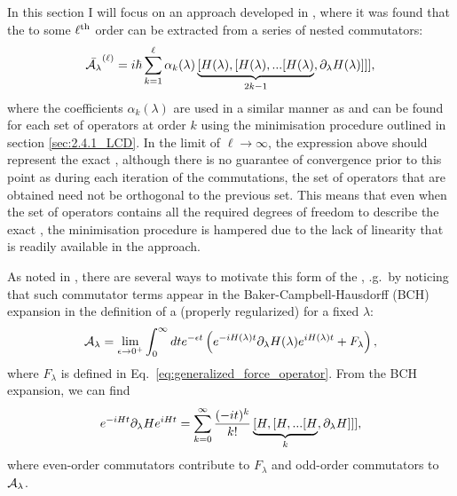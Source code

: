     In this section I will focus on an approach developed in \cite{claeys_floquet-engineering_2019}, where it was found that the  to some $\ell^{\rm th}$ order can be extracted from a series of nested commutators:
    \begin{equation}\label{eq:nested_commutator_AGP}
        \Bar{\mathcal{A}_{\lambda}}^{(\ell)} = i\hbar \sum_{k=1}^\ell \alpha_k(\lambda) \underbrace{[H(\lambda),[H(\lambda),...[H(\lambda)}_{2k-1},\partial_{\lambda} H(\lambda)]]],
    \end{equation}
    where the coefficients $\alpha_k(\lambda)$ are used in a similar manner as  and can be found for each set of operators at order $k$ using the minimisation procedure outlined in section \ref{sec:2.4.1_LCD}. In the limit of $\ell \rightarrow \infty$, the expression above should represent the exact , although there is no guarantee of convergence prior to this point as during each iteration of the commutations, the set of operators that are obtained need not be orthogonal to the previous set. This means that even when the set of operators contains all the required degrees of freedom to describe the exact , the minimisation procedure is hampered due to the lack of linearity that is readily available in the  approach.

    As noted in \cite{claeys_floquet-engineering_2019}, there are several ways to motivate this form of the , \@e.g.~by noticing that such commutator terms appear in the Baker-Campbell-Hausdorff (BCH) expansion in the definition of a (properly regularized) \cite{jarzynski_geometric_1995}  for a fixed $\lambda$:
    \begin{equation}\label{eq:regularised_AGP}
        \mathcal{A}_{\lambda} = \lim_{\epsilon \rightarrow 0^{+}} \int_0^{\infty} dt e^{-\epsilon t} \left( e^{-iH(\lambda) t}\partial_{\lambda} H(\lambda)e^{iH(\lambda) t} + F_{\lambda} \right),
    \end{equation}
    where $F_{\lambda}$ is defined in Eq.~\eqref{eq:generalized_force_operator}. From the BCH expansion, we can find
    \begin{equation}
        e^{-iH t}\partial_{\lambda} H e^{iH t} = \sum_{k = 0}^{\infty} \frac{(-it)^k}{k!} \underbrace{[H,[H,...[H}_{k},\partial_{\lambda} H]]],
    \end{equation}
    where even-order commutators contribute to $F_{\lambda}$ and odd-order commutators to $\mathcal{A}_{\lambda}$.
    
